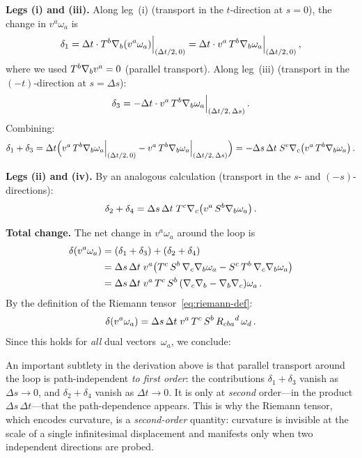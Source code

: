 \medskip\noindent
\textbf{Legs (i) and (iii).}\;
Along leg~(i) (transport in the $t$-direction at $s=0$), the
change in $v^a\omega_a$ is
\[
  \delta_1 = \Delta t \cdot T^b\nabla_b(v^a\omega_a)
    \Big|_{(\Delta t/2,\,0)}
  = \Delta t \cdot v^a\,T^b\nabla_b\omega_a
    \Big|_{(\Delta t/2,\,0)}\,,
\]
where we used $T^b\nabla_b v^a = 0$ (parallel transport).
Along leg~(iii) (transport in the $(-t)$-direction at
$s=\Delta s$):
\[
  \delta_3 = -\Delta t \cdot v^a\,T^b\nabla_b\omega_a
    \Big|_{(\Delta t/2,\,\Delta s)}\,.
\]
Combining:
\begin{equation}\label{eq:delta13}
  \delta_1 + \delta_3
    = \Delta t\Bigl(
        v^a\,T^b\nabla_b\omega_a\Big|_{(\Delta t/2,\,0)}
      - v^a\,T^b\nabla_b\omega_a\Big|_{(\Delta t/2,\,\Delta s)}
      \Bigr)
    = -\Delta s\,\Delta t\;
      S^c\nabla_c\bigl(v^a\,T^b\nabla_b\omega_a\bigr)\,.
\end{equation}

\medskip\noindent
\textbf{Legs (ii) and (iv).}\;
By an analogous calculation (transport in the $s$- and
$(-s)$-directions):
\begin{equation}\label{eq:delta24}
  \delta_2 + \delta_4
    = \Delta s\,\Delta t\;
      T^c\nabla_c\bigl(v^a\,S^b\nabla_b\omega_a\bigr)\,.
\end{equation}

\medskip\noindent
\textbf{Total change.}\;
The net change in $v^a\omega_a$ around the loop is
\begin{align}
  \delta(v^a\omega_a)
    &= (\delta_1+\delta_3) + (\delta_2+\delta_4) \notag\\
    &= \Delta s\,\Delta t\; v^a
      \bigl(
        T^c\,S^b\,\nabla_c\nabla_b\omega_a
        - S^c\,T^b\,\nabla_c\nabla_b\omega_a
      \bigr) \notag\\
    &= \Delta s\,\Delta t\; v^a\,T^c\,S^b\,
      (\nabla_c\nabla_b - \nabla_b\nabla_c)\omega_a\,.
      \label{eq:total-change}
\end{align}
By the definition of the Riemann
tensor~\eqref{eq:riemann-def}:
\begin{equation}\label{eq:loop-riemann}
  \delta(v^a\omega_a)
    = \Delta s\,\Delta t\;
      v^a\,T^c\,S^b\,R_{cba}{}^d\,\omega_d\,.
\end{equation}
Since this holds for \emph{all} dual vectors~$\omega_a$, we
conclude:

\begin{remark}
  An important subtlety in the derivation above is that parallel
  transport around the loop is path-independent \emph{to first
  order}: the contributions $\delta_1+\delta_3$ vanish as
  $\Delta s\to 0$, and $\delta_2+\delta_4$ vanish as
  $\Delta t\to 0$.  It is only at \emph{second} order---in the
  product $\Delta s\,\Delta t$---that the path-dependence
  appears.  This is why the Riemann tensor, which encodes
  curvature, is a \emph{second-order} quantity: curvature is
  invisible at the scale of a single infinitesimal displacement
  and manifests only when two independent directions are probed.
\end{remark}

